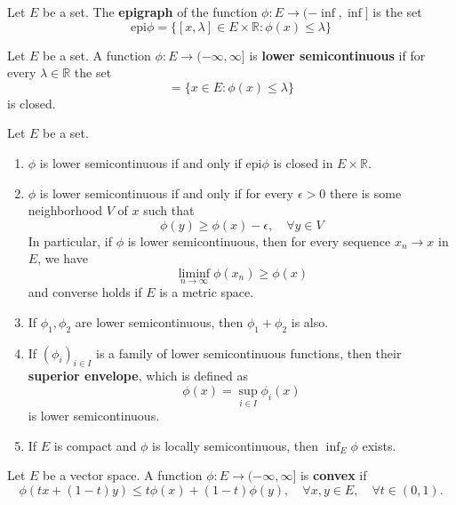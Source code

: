 \begin{defn} Let $E$ be a set. The \textbf{epigraph} of the function $\phi:E\rightarrow (-\inf,\inf]$ is the set
\begin{equation}
\textrm{epi}\phi=\{[x,\lambda]\in E\times \mathbb{R}:\phi(x)\leq \lambda	\}
\end{equation}
\end{defn}

\begin{defn} Let $E$ be a set. A function $\phi:E\rightarrow (-\infty,\infty]$ is \textbf{lower semicontinuous} if for every $\lambda\in \mathbb{R}$ the set
\begin{equation}
[\phi\leq \lambda]=\{x\in E:\phi(x)\leq \lambda\}
\end{equation}
is closed.
\end{defn}

\begin{prop} Let $E$ be a set.
\begin{enumerate}
\item $\phi$ is lower semicontinuous if and only if $\textrm{epi}\phi$ is closed in $E\times \mathbb{R}$.
\item $\phi$ is lower semicontinuous if and only if for every $\epsilon>0$ there is some neighborhood $V$ of $x$ such that
\begin{equation}
\phi(y)\geq \phi(x)-\epsilon,\quad \forall y\in V
\end{equation}
In particular, if $\phi$ is lower semicontinuous, then for every sequence $x_n\rightarrow x$ in $E$, we have
\begin{equation}
\liminf_{n\rightarrow \infty}\phi(x_n)\geq \phi(x)
\end{equation}
and converse holds if $E$ is a metric space.
\item If $\phi_1,\phi_2$ are lower semicontinuous, then $\phi_1+\phi_2$ is also.
\item If $(\phi_i)_{i\in I}$ is a family of lower semicontinuous functions, then their \textbf{superior envelope}, which is defined as
\begin{equation}
\phi(x)=\sup_{i\in I}\phi_i(x)
\end{equation}
is lower semicontinuous.
\item If $E$ is compact and $\phi$ is locally semicontinuous, then $\inf_E\phi$ exists.
\end{enumerate}
\end{prop}

\begin{defn} Let $E$ be a vector space. A function $\phi:E\rightarrow (-\infty,\infty]$ is \textbf{convex} if
\begin{equation}
\phi(tx+(1-t)y)\leq t\phi(x)+(1-t)\phi(y),\quad \forall x,y\in E,\quad \forall t\in (0,1).
\end{equation} 
\end{defn}

